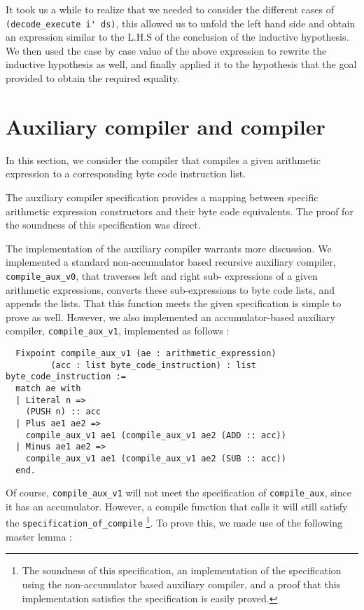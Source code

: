 \documentclass[12pt, a4paper]{article}
\begin{document}
It took us a while to realize that we needed to consider the different cases of 
\verb-(decode_execute i' ds)-, this allowed us to unfold the left hand side
and obtain an expression similar to the L.H.S of the conclusion of the inductive
hypothesis. We then used the case by case value of the above expression to rewrite
the inductive hypothesis as well, and finally applied it to the hypothesis that
the goal provided to obtain the required equality.


\section{Auxiliary compiler and compiler}
In this section,  we consider the compiler that compiles a given arithmetic 
expression to a
corresponding byte code instruction list. 

The auxiliary compiler specification 
provides a mapping between specific arithmetic expression constructors and their
byte code equivalents. The proof for the soundness of this specification was direct. 

The implementation of the auxiliary compiler warrants more discussion. We implemented
a standard non-accumulator based recursive auxiliary compiler, \verb-compile_aux_v0-, that traverses left and right sub-
expressions of a given arithmetic expressions, converts these sub-expressions to 
byte code lists, and appends the lists. That this function meets the given 
specification is simple to prove as well. However, we also implemented an accumulator-based auxiliary compiler, \verb-compile_aux_v1-, implemented as follows :

\begin{lstlisting}
  Fixpoint compile_aux_v1 (ae : arithmetic_expression)
         (acc : list byte_code_instruction) : list byte_code_instruction :=
  match ae with
  | Literal n =>
    (PUSH n) :: acc
  | Plus ae1 ae2 =>
    compile_aux_v1 ae1 (compile_aux_v1 ae2 (ADD :: acc))
  | Minus ae1 ae2 =>
    compile_aux_v1 ae1 (compile_aux_v1 ae2 (SUB :: acc))
  end.
\end{lstlisting}

Of course, \verb-compile_aux_v1- will not meet the specification of \verb-compile_aux-, since it has an accumulator. However, a compile function that calls it will
still satisfy the \verb-specification_of_compile- \footnote {The soundness of
this specification, an implementation of the specification using the non-accumulator 
based auxiliary compiler, and a proof that this implementation satisfies the 
specification is easily proved.}. To prove this, we made use of the following master
lemma : 
\end{document}
